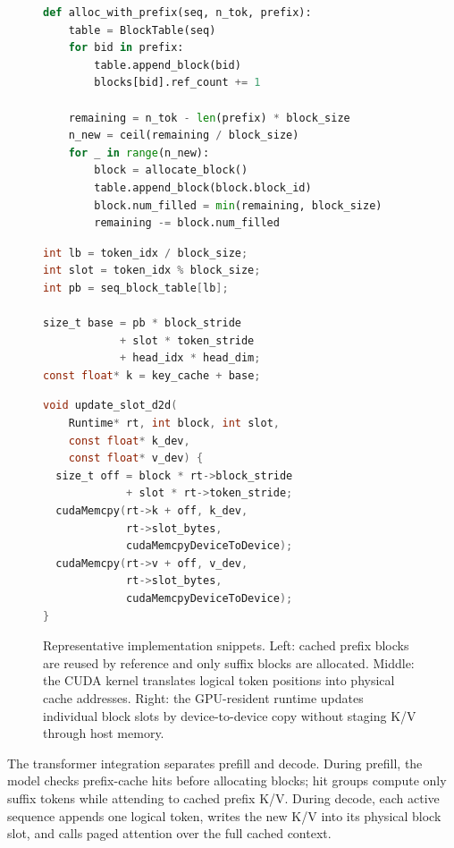 \documentclass{article}
\begin{document}
\begin{figure}[t]
\centering
\begin{minipage}[t]{0.32\textwidth}
\begin{lstlisting}[language=Python]
def alloc_with_prefix(seq, n_tok, prefix):
    table = BlockTable(seq)
    for bid in prefix:
        table.append_block(bid)
        blocks[bid].ref_count += 1

    remaining = n_tok - len(prefix) * block_size
    n_new = ceil(remaining / block_size)
    for _ in range(n_new):
        block = allocate_block()
        table.append_block(block.block_id)
        block.num_filled = min(remaining, block_size)
        remaining -= block.num_filled
\end{lstlisting}
\end{minipage}\hfill
\begin{minipage}[t]{0.32\textwidth}
\begin{lstlisting}[language=C]
int lb = token_idx / block_size;
int slot = token_idx % block_size;
int pb = seq_block_table[lb];

size_t base = pb * block_stride
            + slot * token_stride
            + head_idx * head_dim;
const float* k = key_cache + base;
\end{lstlisting}
\end{minipage}\hfill
\begin{minipage}[t]{0.32\textwidth}
\begin{lstlisting}[language=C]
void update_slot_d2d(
    Runtime* rt, int block, int slot,
    const float* k_dev,
    const float* v_dev) {
  size_t off = block * rt->block_stride
             + slot * rt->token_stride;
  cudaMemcpy(rt->k + off, k_dev,
             rt->slot_bytes,
             cudaMemcpyDeviceToDevice);
  cudaMemcpy(rt->v + off, v_dev,
             rt->slot_bytes,
             cudaMemcpyDeviceToDevice);
}
\end{lstlisting}
\end{minipage}
\caption{Representative implementation snippets.  Left: cached prefix blocks are reused by reference and only suffix blocks are allocated.  Middle: the CUDA kernel translates logical token positions into physical cache addresses.  Right: the GPU-resident runtime updates individual block slots by device-to-device copy without staging K/V through host memory.}
\label{fig:snippets}
\end{figure}

The transformer integration separates prefill and decode.  During prefill, the model checks prefix-cache hits before allocating blocks; hit groups compute only suffix tokens while attending to cached prefix K/V.  During decode, each active sequence appends one logical token, writes the new K/V into its physical block slot, and calls paged attention over the full cached context.
\end{document}
